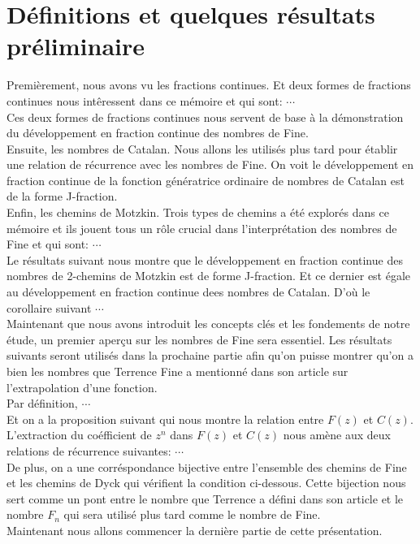 \documentclass{report}
\begin{document}
    \section*{Définitions et quelques résultats préliminaire}
    Premièrement, nous avons vu les fractions continues. Et deux formes de fractions continues nous intêressent dans ce mémoire et qui sont: $\cdots$\\ 
    Ces deux formes de fractions continues nous servent de base à la démonstration du développement en fraction continue des nombres de Fine.\vspace{7pt}\\
    Ensuite, les nombres de Catalan. Nous allons les utilisés plus tard pour établir une relation de récurrence avec les nombres de Fine. On voit le développement en fraction continue de la fonction génératrice ordinaire de nombres de Catalan est de la forme J-fraction.\vspace{7pt}\\
    Enfin, les chemins de Motzkin. Trois types de chemins a été explorés dans ce mémoire et ils jouent tous un rôle crucial dans l'interprétation des nombres de Fine et qui sont: $\cdots$\\
    Le résultats suivant nous montre que le développement en fraction continue des nombres de 2-chemins de Motzkin est de forme J-fraction. Et ce dernier est égale au développement en fraction continue dees nombres de Catalan. D'où le corollaire suivant $\cdots$\vspace{7pt}\\
    Maintenant que nous avons introduit les concepts clés et les fondements de notre étude, un premier aperçu sur les nombres de Fine sera essentiel. Les résultats suivants seront utilisés dans la prochaine partie afin qu'on puisse montrer qu'on a bien les nombres que Terrence Fine a mentionné dans son article sur l'extrapolation d'une fonction.\\
    Par définition, $\cdots$\\
    Et on a la proposition suivant qui nous montre la relation entre $F(z)$ et $C(z)$.\\
    L'extraction du coéfficient de $z^{n}$ dans $F(z)$ et $C(z)$ nous amène aux deux relations de récurrence suivantes: $\cdots$\\
    De plus, on a une corréspondance bijective entre l'ensemble des chemins de Fine et les chemins de Dyck qui vérifient la condition ci-dessous.
    Cette bijection nous sert comme un pont entre le nombre que Terrence a défini dans son article et le nombre $F_{n}$ qui sera utilisé plus tard comme le nombre de Fine.\vspace{7pt}\\
    Maintenant nous allons commencer la dernière partie de cette présentation.
\end{document}
